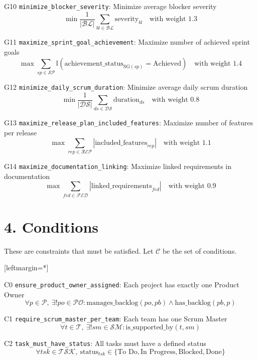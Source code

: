 \documentclass[12pt]{article}
\begin{document}
    \item[G10] \texttt{minimize\_blocker\_severity}: Minimize average blocker severity
    \[
    \min \frac{1}{|\mathcal{BL}|} \sum_{bl \in \mathcal{BL}} \text{severity}_{bl} \quad \text{with weight } 1.3
    \]

    \item[G11] \texttt{maximize\_sprint\_goal\_achievement}: Maximize number of achieved sprint goals
    \[
    \max \sum_{sp \in \mathcal{SP}} \mathbb{I}(\text{achievement\_status}_{\text{SG}(sp)} = \text{Achieved}) \quad \text{with weight } 1.4
    \]

    \item[G12] \texttt{minimize\_daily\_scrum\_duration}: Minimize average daily scrum duration
    \[
    \min \frac{1}{|\mathcal{DS}|} \sum_{ds \in \mathcal{DS}} \text{duration}_{ds} \quad \text{with weight } 0.8
    \]

    \item[G13] \texttt{maximize\_release\_plan\_included\_features}: Maximize number of features per release
    \[
    \max \sum_{rep \in \mathcal{REP}} |\text{included\_features}_{rep}| \quad \text{with weight } 1.1
    \]

    \item[G14] \texttt{maximize\_documentation\_linking}: Maximize linked requirements in documentation
    \[
    \max \sum_{fed \in \mathcal{FED}} |\text{linked\_requirements}_{fed}| \quad \text{with weight } 0.9
    \]

\section{4. Conditions}
These are constraints that must be satisfied. Let $ \mathcal{C} $ be the set of conditions.

[leftmargin=*]
    \item[C0] \texttt{ensure\_product\_owner\_assigned}: Each project has exactly one Product Owner
    \[
    \forall p \in \mathcal{P},\ \exists! po \in \mathcal{PO} : \text{manages\_backlog}(po, pb) \land \text{has\_backlog}(pb, p)
    \]

    \item[C1] \texttt{require\_scrum\_master\_per\_team}: Each team has one Scrum Master
    \[
    \forall t \in \mathcal{T},\ \exists! sm \in \mathcal{SM} : \text{is\_supported\_by}(t, sm)
    \]

    \item[C2] \texttt{task\_must\_have\_status}: All tasks must have a defined status
    \[
    \forall tsk \in \mathcal{TSK},\ \text{status}_{tsk} \in \{\text{To Do}, \text{In Progress}, \text{Blocked}, \text{Done}\}
    \]
\end{document}
